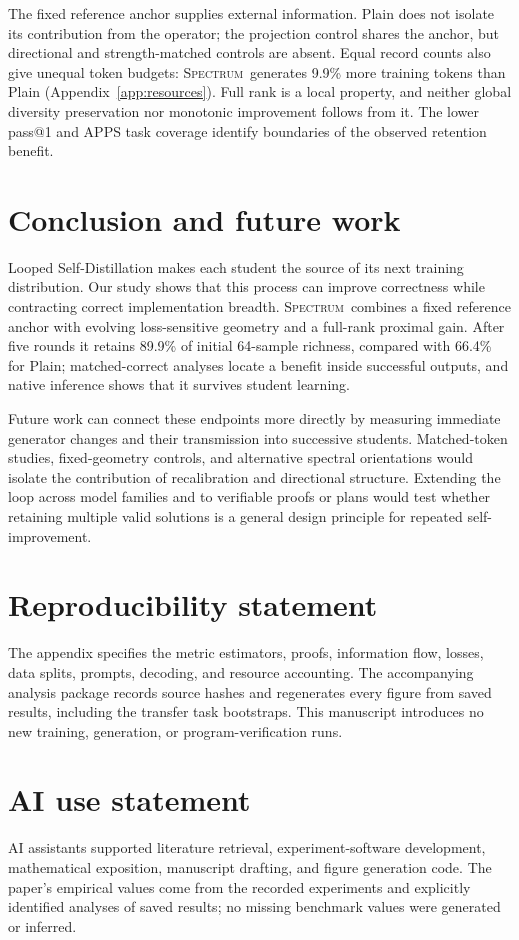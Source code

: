 \documentclass{article}
\newcommand{\method}{\textsc{Spectrum}}
\begin{document}
The fixed reference anchor supplies external information. Plain does not isolate its contribution from the operator; the projection control shares the anchor, but directional and strength-matched controls are absent. Equal record counts also give unequal token budgets: \method\ generates 9.9\% more training tokens than Plain (Appendix~\ref{app:resources}). Full rank is a local property, and neither global diversity preservation nor monotonic improvement follows from it. The lower pass@1 and APPS task coverage identify boundaries of the observed retention benefit.

\section{Conclusion and future work}
\label{sec:conclusion}
Looped Self-Distillation makes each student the source of its next training distribution. Our study shows that this process can improve correctness while contracting correct implementation breadth. \method\ combines a fixed reference anchor with evolving loss-sensitive geometry and a full-rank proximal gain. After five rounds it retains 89.9\% of initial 64-sample richness, compared with 66.4\% for Plain; matched-correct analyses locate a benefit inside successful outputs, and native inference shows that it survives student learning.

Future work can connect these endpoints more directly by measuring immediate generator changes and their transmission into successive students. Matched-token studies, fixed-geometry controls, and alternative spectral orientations would isolate the contribution of recalibration and directional structure. Extending the loop across model families and to verifiable proofs or plans would test whether retaining multiple valid solutions is a general design principle for repeated self-improvement.

\clearpage
\section*{Reproducibility statement}
The appendix specifies the metric estimators, proofs, information flow, losses, data splits, prompts, decoding, and resource accounting. The accompanying analysis package records source hashes and regenerates every figure from saved results, including the transfer task bootstraps. This manuscript introduces no new training, generation, or program-verification runs.

\section*{AI use statement}
AI assistants supported literature retrieval, experiment-software development, mathematical exposition, manuscript drafting, and figure generation code. The paper's empirical values come from the recorded experiments and explicitly identified analyses of saved results; no missing benchmark values were generated or inferred.
\end{document}
